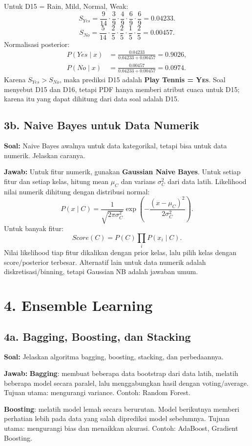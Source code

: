 \documentclass[10pt,a4paper,twocolumn]{article}
\newcommand{\jawab}{\textbf{Jawab: }}
\newcommand{\soal}{\textbf{Soal: }}
\newcommand{\yes}{\textsc{Yes}}
\begin{document}
Untuk D15 = Rain, Mild, Normal, Weak:
\[
S_{Yes}=\frac{9}{14}\cdot\frac{3}{9}\cdot\frac{4}{9}\cdot\frac{6}{9}\cdot\frac{6}{9}=0.04233.
\]
\[
S_{No}=\frac{5}{14}\cdot\frac{2}{5}\cdot\frac{2}{5}\cdot\frac{1}{5}\cdot\frac{2}{5}=0.00457.
\]
Normalisasi posterior:
\[
\begin{aligned}
P(Yes\mid x)&=\frac{0.04233}{0.04233+0.00457}=0.9026,\\
P(No\mid x)&=\frac{0.00457}{0.04233+0.00457}=0.0974.
\end{aligned}
\]
Karena $S_{Yes}>S_{No}$, maka prediksi D15 adalah \textbf{Play Tennis = \yes}. Soal menyebut D15 dan D16, tetapi PDF hanya memberi atribut cuaca untuk D15; karena itu yang dapat dihitung dari data soal adalah D15.

\subsection*{3b. Naive Bayes untuk Data Numerik}
\soal Naive Bayes awalnya untuk data kategorikal, tetapi bisa untuk data numerik. Jelaskan caranya.

\jawab Untuk fitur numerik, gunakan \textbf{Gaussian Naive Bayes}. Untuk setiap fitur dan setiap kelas, hitung mean $\mu_C$ dan varians $\sigma_C^2$ dari data latih. Likelihood nilai numerik dihitung dengan distribusi normal:
\[
P(x\mid C)=\frac{1}{\sqrt{2\pi\sigma_C^2}}\exp\left(-\frac{(x-\mu_C)^2}{2\sigma_C^2}\right).
\]
Untuk banyak fitur:
\[
Score(C)=P(C)\prod_i P(x_i\mid C).
\]
Nilai likelihood tiap fitur dikalikan dengan prior kelas, lalu pilih kelas dengan score/posterior terbesar. Alternatif lain untuk data numerik adalah diskretisasi/binning, tetapi Gaussian NB adalah jawaban umum.

\section*{4. Ensemble Learning}

\subsection*{4a. Bagging, Boosting, dan Stacking}
\soal Jelaskan algoritma bagging, boosting, stacking, dan perbedaannya.

\jawab
\textbf{Bagging}: membuat beberapa data bootstrap dari data latih, melatih beberapa model secara paralel, lalu menggabungkan hasil dengan voting/average. Tujuan utama: mengurangi variance. Contoh: Random Forest.

\textbf{Boosting}: melatih model lemah secara berurutan. Model berikutnya memberi perhatian lebih pada data yang salah diprediksi model sebelumnya. Tujuan utama: mengurangi bias dan menaikkan akurasi. Contoh: AdaBoost, Gradient Boosting.
\end{document}
